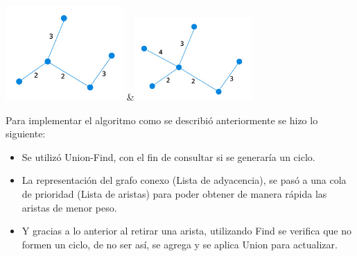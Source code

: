 \documentclass[letterpaper,11pt]{article}
\begin{document}
\begin{table}[h]
\begin{tabu}
                \includegraphics[width=45mm]{kruskal4.png} &\includegraphics[width=45mm]{kruskal5.png} \\
                \end{tabu}
            \end{table}

            Para implementar el algoritmo como se describió anteriormente se hizo lo siguiente:
            \begin{itemize}
                \item Se utilizó Union-Find, con el fin de consultar si se generaría un ciclo.
                \item La representación del grafo conexo (Lista de adyacencia), se pasó a una cola de prioridad (Lista de aristas) para poder obtener de manera rápida las aristas de menor peso.
                \item Y gracias a lo anterior al retirar una arista, utilizando Find se verifica que no formen un ciclo, de no ser así, se agrega y se aplica Union para actualizar.    
            \end{itemize}
                
\end{document}
